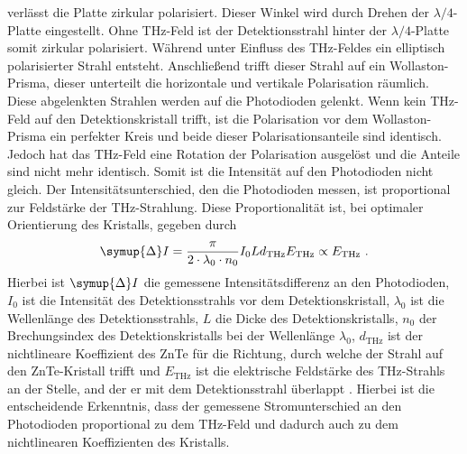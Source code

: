 verlässt die Platte zirkular polarisiert. Dieser Winkel wird durch Drehen der
$\lambda/4$-Platte eingestellt.
Ohne THz-Feld ist der Detektionsstrahl hinter der $\lambda/4$-Platte somit zirkular
polarisiert. 
Während unter Einfluss des THz-Feldes ein elliptisch polarisierter Strahl entsteht.
Anschließend trifft dieser Strahl auf ein Wollaston-Prisma, 
dieser unterteilt die horizontale und vertikale Polarisation räumlich. 
Diese abgelenkten Strahlen werden auf die Photodioden gelenkt.
Wenn kein THz-Feld auf den Detektionskristall trifft, ist die Polarisation vor dem 
Wollaston-Prisma ein perfekter Kreis und beide dieser Polarisationsanteile sind identisch. 
Jedoch hat das THz-Feld eine Rotation der Polarisation ausgelöst und die Anteile 
sind nicht mehr identisch. 
Somit ist die Intensität auf den Photodioden nicht gleich. 
Der Intensitätsunterschied, den die Photodioden messen, ist proportional zur Feldstärke der 
THz-Strahlung. 
Diese Proportionalität ist, bei optimaler Orientierung des Kristalls, gegeben durch
\begin{equation}
    \symup{\Delta} I  =  \frac{ \pi}{2\cdot\lambda_0\cdot n_0}I_0 Ld_\text{THz}E_\text{THz}\propto E_\text{THz}\ .
\end{equation}
Hierbei ist $\symup{\Delta}I$ die gemessene Intensitätsdifferenz an den Photodioden, $I_0$ ist die Intensität des Detektionsstrahls 
vor dem Detektionskristall, $\lambda_0$ ist die Wellenlänge des Detektionsstrahls, $L$ die Dicke des Detektionskristalls, 
$n_0$ der Brechungsindex des Detektionskristalls bei der Wellenlänge $\lambda_0$, $d_\text{THz}$ ist der nichtlineare Koeffizient des 
ZnTe für die Richtung, durch welche der Strahl auf den ZnTe-Kristall trifft und $E_\text{THz}$ ist die elektrische Feldstärke des 
THz-Strahls an der Stelle, and der er mit dem Detektionsstrahl überlappt \cite{Planken2001}.
Hierbei ist die entscheidende Erkenntnis, dass der gemessene Stromunterschied an den Photodioden proportional zu dem 
THz-Feld und dadurch auch zu dem nichtlinearen Koeffizienten des Kristalls.


